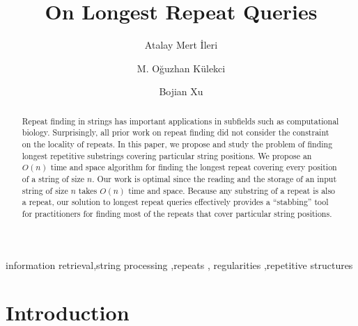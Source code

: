 \documentclass[preprint]{elsarticle}
\begin{document}
\begin{frontmatter}

  \title{On Longest Repeat Queries}


\author[a1]{Atalay Mert \.{I}leri}
\address[a1]{Massachusetts Institute of Technology, USA}

\author[a2]{M. O\u{g}uzhan  K\"{u}lekci}
\address[a2]{Istanbul Medipol University, Turkey}

\author[a3]{Bojian Xu} 
\address[a3]{
Eastern Washington University, USA}
 



\begin{abstract} 
  Repeat finding in strings has important applications in subfields
  such as computational biology. Surprisingly, all prior work on
  repeat finding did not consider the constraint on the locality of
  repeats. In this paper, we propose and study the problem of finding
  longest repetitive substrings covering particular string positions.
  We propose an $O(n)$ time and space algorithm for finding the
  longest repeat covering every position of a string of size $n$. Our
  work is optimal since the reading and the storage of an input string
  of size $n$ takes $O(n)$ time and space.  Because any
  substring of a repeat is also a repeat, our solution to longest
  repeat queries effectively provides a ``stabbing'' tool for
  practitioners for finding most of the repeats that cover particular string
  positions.
 \end{abstract}







\begin{keyword}
   information retrieval\sep string processing \sep repeats \sep
   regularities \sep repetitive structures
 \end{keyword}


\end{frontmatter}



\section{Introduction}
\end{document}
